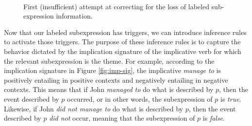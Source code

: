 \begin{figure}[t]
  \centering
  ~~~~~~~~~
  \caption{First (insufficient) attempt at correcting for the loss of labeled
  sub-expression information.}
  \label{drs:impl-2}
\end{figure}

Now that our labeled subexpression has triggers, we can introduce inference
rules to activate those triggers.  The purpose of these inference rules is to
capture the behavior dictated by the implication signature of the implicative
verb for which the relevant subexpression is the theme.  For example, according
to the implication signature in Figure \ref{fig:imp-sig}, the implicative {\it
manage to} is positively entailing in positive contexts and negatively entailing in negative contexts.
This means that if John {\it managed to} do what is described by $p$, then the
event described by $p$ occurred, or in other words, the subexpression of $p$ is
{\it true}. Likewise, if John {\it did not manage to} do what is described by
$p$, then the event described by $p$ {\it did not} occur, meaning that the
subexpression of $p$ is {\it false}.  


